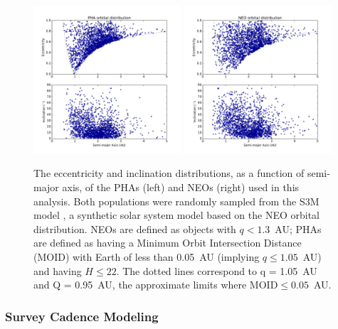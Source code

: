 \begin{figure}[t!]
\centering
\includegraphics[width=0.49\textwidth]{figures/phas_2k_orbits}
\includegraphics[width=0.49\textwidth]{figures/neos_2k_orbits}
\vskip -0.2in
\caption{The eccentricity and inclination distributions, as a function of semi-major axis, of the PHAs (left) and NEOs (right) used in this analysis. Both populations were randomly sampled from the S3M model \citep{Grav2011}, a synthetic solar system model based on the \cite{Bottke2002} NEO orbital distribution. NEOs are defined as objects with $q<1.3$~AU; PHAs are defined as having a Minimum Orbit Intersection Distance (MOID) with Earth of less than 0.05~AU (implying $q\le1.05$~AU) and having $H\le22$.  The dotted lines correspond to q = 1.05~AU and Q = 0.95~AU, the approximate limits where MOID$\le 0.05$~AU. \label{fig:PHA_orbits}}
\end{figure}

\subsubsection{Survey Cadence Modeling}

